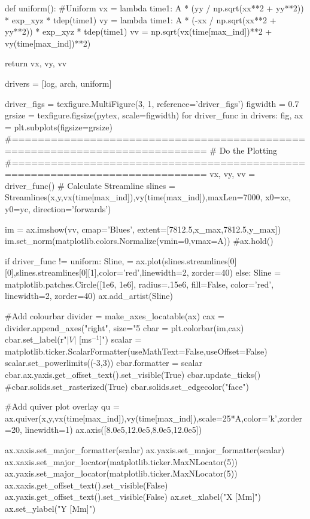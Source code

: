 \begin{pycode}[chapter4]
def uniform():
    #Uniform
    vx = lambda time1: A * (yy / np.sqrt(xx**2 + yy**2)) * exp_xyz * tdep(time1)
    vy = lambda time1: A * (-xx / np.sqrt(xx**2 + yy**2)) * exp_xyz * tdep(time1)
    vv = np.sqrt(vx(time[max_ind])**2 + vy(time[max_ind])**2)
    
    return vx, vy, vv

drivers = [log, arch, uniform]

driver_figs = texfigure.MultiFigure(3, 1, reference='driver_figs')
figwidth = 0.7
grsize = texfigure.figsize(pytex, scale=figwidth)
for driver_func in drivers:
    fig, ax = plt.subplots(figsize=grsize)
    #============================================================================
    # Do the Plotting
    #============================================================================
    vx, vy, vv = driver_func()
    # Calculate Streamline
    slines = Streamlines(x,y,vx(time[max_ind]),vy(time[max_ind]),maxLen=7000,
                         x0=xc, y0=yc, direction='forwards')

    im = ax.imshow(vv, cmap='Blues', extent=[7812.5,x_max,7812.5,y_max])
    im.set_norm(matplotlib.colors.Normalize(vmin=0,vmax=A))
    #ax.hold()
    
    if driver_func != uniform:
        Sline, = ax.plot(slines.streamlines[0][0],slines.streamlines[0][1],color='red',linewidth=2, zorder=40)
    else:
	    Sline = matplotlib.patches.Circle([1e6, 1e6], radius=.15e6, fill=False, color='red', linewidth=2, zorder=40)
	    ax.add_artist(Sline)

    #Add colourbar
    divider = make_axes_locatable(ax)
    cax = divider.append_axes("right", size="5%
    cbar = plt.colorbar(im,cax)
    cbar.set_label(r"$|V|$ [ms$^{-1}$]")
    scalar = matplotlib.ticker.ScalarFormatter(useMathText=False,useOffset=False)
    scalar.set_powerlimits((-3,3))
    cbar.formatter = scalar
    cbar.ax.yaxis.get_offset_text().set_visible(True)
    cbar.update_ticks()
    #cbar.solids.set_rasterized(True)
    cbar.solids.set_edgecolor("face")

    #Add quiver plot overlay
    qu = ax.quiver(x,y,vx(time[max_ind]),vy(time[max_ind]),scale=25*A,color='k',zorder=20, linewidth=1)
    ax.axis([8.0e5,12.0e5,8.0e5,12.0e5])

    ax.xaxis.set_major_formatter(scalar)
    ax.yaxis.set_major_formatter(scalar)
    ax.xaxis.set_major_locator(matplotlib.ticker.MaxNLocator(5))
    ax.yaxis.set_major_locator(matplotlib.ticker.MaxNLocator(5))
    ax.xaxis.get_offset_text().set_visible(False)
    ax.yaxis.get_offset_text().set_visible(False)
    ax.set_xlabel("X [Mm]")
    ax.set_ylabel("Y [Mm]")


\end{pycode}

